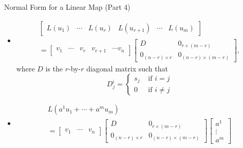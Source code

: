 \documentclass[usenames,dvipsnames,10pt]{beamer}
\begin{document}
\begin{frame}
  {Normal Form for a Linear Map (Part 4)}

  \begin{itemize}
  \item
    \begin{multline*}
      \left[\begin{array}{ccc|ccc} L(u_1) & \cdots & L(u_r) & L(u_{r+1}) & \cdots & L(u_m) \end{array} \right]\\
      = \left[\begin{array}{ccc|ccc} v_1 & \cdots & v_r & v_{r+1} & \cdots v_n \end{array}\right]
      \left[\begin{array}{c|c} D & 0_{r\times (m-r)} \\ \hline 0_{(n-r)\times r} & 0_{(n-r)\times (m-r)}\end{array}\right],
    \end{multline*}
    where $D$ is the $r$-by-$r$ diagonal matrix such that
    \[
      D^i_j =
      \begin{cases}
        s_j &\text{ if }i = j\\
        0 &\text{ if }i \ne j
      \end{cases}
    \]
  \item
    \begin{multline*}
      L(a^1u_1 + \cdots + a^mu_m)\\
      = \begin{bmatrix} v_1 & \cdots & v_n\end{bmatrix}
      \left[\begin{array}{c|c} D & 0_{r\times (m-r)} \\ \hline 0_{(n-r)\times r} & 0_{(n-r)\times (m-r)}\end{array}\right]\begin{bmatrix} a^1 \\ \vdots \\ a^m \end{bmatrix}
    \end{multline*}
  \end{itemize}
\end{frame}
\end{document}
